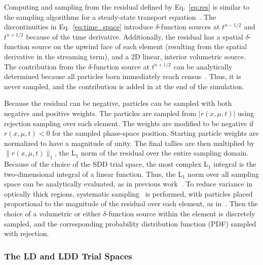 \documentclass{anstrans}
\begin{document}
Computing and sampling from the residual defined by Eq.~\eqref{eq:res} is similar to the sampling algorithms
for a steady-state transport equation~\cite{jake,jake_thesis,bolding_nse}. 
The discontinuities in Eq.~\eqref{eq:time_space} introduce $\delta$-function sources at $t^{n-1/2}$ and $t^{n+1/2}$
because of the time derivative.  Additionally, the residual has a spatial $\delta$-function source
on the upwind face of each element (resulting from the spatial
derivative in the streaming term), and a 2D linear, interior volumetric source.
The contribution from the $\delta$-function source at $t^{n+1/2}$ can be analytically
determined because all particles born immediately reach census~\cite{dissertation}.  Thus, it is never sampled, and the
contribution is added in at the end of the simulation.  

Because the residual can be negative, particles can be sampled with both negative and positive weights.  The
particles are sampled from $|r(x,\mu,t)|$ using rejection sampling over each element. The weights are
modified to be negative if $r(x,\mu,t)<0$ for the sampled phase-space position.
Starting particle weights are normalized to have a magnitude of unity.  The 
final tallies are then multiplied by $\|r(x,\mu,t)\|_1$, the L$_1$ norm of the residual over the entire
sampling domain.  Because of the choice of the SDD trial space, the most complex L$_1$ integral is
the two-dimensional integral of a linear function.  Thus, the L$_1$ norm over all sampling space can be analytically
evaluated, as in previous work~\cite{jake}. To reduce variance in optically
thick regions, systematic sampling~\cite{shultis_mc} is performed, with particles placed proportional to the magnitude
of the residual over each element, as in~\cite{bolding_nse}.  Then the choice of a volumetric or either
$\delta$-function source within the element is discretely sampled, and the corresponding probability
distribution function (PDF) sampled with rejection.  
%
\subsubsection{The LD and LDD Trial Spaces}
\end{document}
